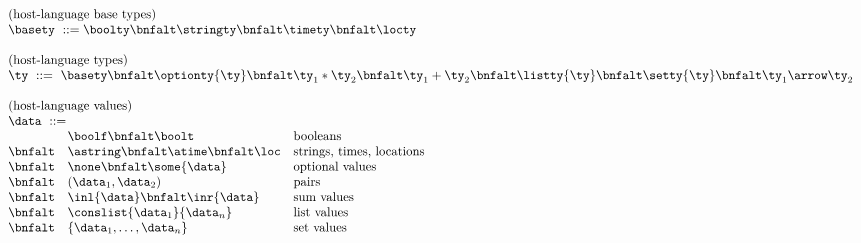 \begin{figure}[t]
\[
\begin{array}{lll}
\multicolumn{3}{l}{\mbox{(host-language base types)}}\\ 
\multicolumn{3}{l}{\basety \ ::= \boolty \bnfalt \stringty \bnfalt
  \timety \bnfalt \locty} \\
\\
\multicolumn{3}{l}{\mbox{(host-language types)}}\\ 
\multicolumn{3}{l}{\ty \ ::=\ \basety
\bnfalt \optionty{\ty}
\bnfalt \ty_1 * \ty_2
\bnfalt \ty_1 + \ty_2
\bnfalt \listty{\ty}
\bnfalt \setty{\ty}
\bnfalt \ty_1 \arrow \ty_2
} \\
\\
\multicolumn{3}{l}{\mbox{(host-language values)}}\\ 
\multicolumn{3}{l}{\data \ ::=} \\
& \boolf \bnfalt \boolt & \mbox{booleans} \\
\bnfalt & \astring \bnfalt \atime \bnfalt \loc &
 \mbox{strings, times, locations} \\
\bnfalt & \none \bnfalt 
                           \some{\data} & \mbox{optional values}\\
\bnfalt & (\data_1,\data_2) & \mbox{pairs} \\
\bnfalt & \inl{\data} \bnfalt 
                           \inr{\data} & \mbox{sum values} \\
\bnfalt & 
                           \conslist{\data_1}{\data_n} & \mbox{list values} \\
\bnfalt &                  \{\data_1,\ldots,\data_n\} & \mbox{set values} \\



\end{array}\]
\end{figure}

